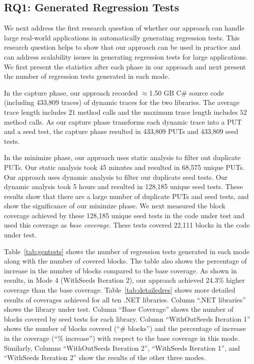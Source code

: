 \subsection{RQ1: Generated Regression Tests}

We next address the first research question of whether our approach can handle large real-world applications in automatically generating regression tests. This research question helps to show that our approach can be used in practice and can address scalability issues in generating regression tests for large applications. We first present the statistics after each phase in our approach and next present the number of regression tests generated in each mode.

In the capture phase, our approach recorded $\approx$1.50 GB C\# source code (including 433,809 traces) of dynamic traces for the two libraries. The average trace length includes $21$ method calls and the maximum trace length includes $52$ method calls. As our capture phase transforms each dynamic trace into a PUT and a seed test, the capture phase resulted in 433,809 PUTs and 433,809 seed tests. 

In the minimize phase, our approach uses static analysis to filter out duplicate PUTs. Our static analysis took 45 minutes and resulted in 68,575 unique PUTs. Our approach uses dynamic analysis to filter our duplicate seed tests. Our dynamic analysis took 5 hours and resulted in 128,185 unique seed tests. These results show that there are a large number of duplicate PUTs and seed tests, and show the significance of our minimize phase. We next measured the block coverage achieved by these 128,185 unique seed tests in the code under test and used this coverage as \emph{base coverage}. These tests covered 22,111 blocks in the code under test. 

Table~\ref{tab:gentests} shows the number of regression tests generated in each mode along with the number of covered blocks. The table also shows the percentage of increase
in the number of blocks compared to the base coverage. As shown in results, in Mode 4 (WithSeeds Iteration 2), our approach achieved 24.3\% higher coverage than the base coverage. Table~\ref{tab:detailedres} shows more detailed results of coverages achieved for all ten .NET libraries. Column ``.NET libraries'' shows the library under test. Column ``Base Coverage'' shows the number of blocks covered by seed tests for each library. Column ``WithOutSeeds Iteration 1'' shows the number of blocks covered (``\# blocks'') and the percentage of increase in the coverage (``\% increase'') with respect to the base coverage in this mode. Similarly, Columns ``WithOutSeeds Iteration 2'', ``WithSeeds Iteration 1'', and ``WithSeeds Iteration 2'' show the results of the other three modes. 

